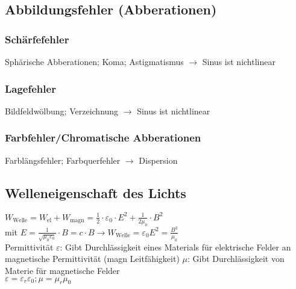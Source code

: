 \documentclass[fs, footer]{latex4ei}
\begin{document}
\begin{multicols*}{4}
\subsection{Abbildungsfehler (Abberationen)} %
\subsubsection{Schärfefehler}
Sphärische Abberationen; %
Koma; 
Astigmatismus $\rightarrow$ Sinus ist nichtlinear\\
\subsubsection{Lagefehler}
Bildfeldwölbung; 
Verzeichnung $\rightarrow$ Sinus ist nichtlinear
\subsubsection{Farbfehler/Chromatische Abberationen}
Farblängsfehler; Farbquerfehler $\rightarrow$ Dispersion\\

\subsection{Welleneigenschaft des Lichts}
$W_{\text{Welle}} = W_{\text{el}}+W_{\text{magn}} = \frac{1}{2}\cdot\varepsilon_0\cdot E^2 + \frac{1}{2\mu_0}\cdot B^2$\\
mit $E = \frac{1}{\sqrt{\mu_0\varepsilon_0}}\cdot B = c\cdot B \rightarrow W_{\text{Welle}} = \varepsilon_0E^2 = \frac{B^2}{\mu_0}$\\
Permittivität $\varepsilon$: Gibt Durchlässigkeit eines Materials für elektrische Felder an\\
magnetische Permittivität (magn Leitfähigkeit) $\mu$: Gibt Durchlässigkeit von Materie für magnetische Felder\\
$\varepsilon = \varepsilon_r\varepsilon_0; \mu = \mu_r\mu_0$\\


\end{multicols*}
\end{document}
